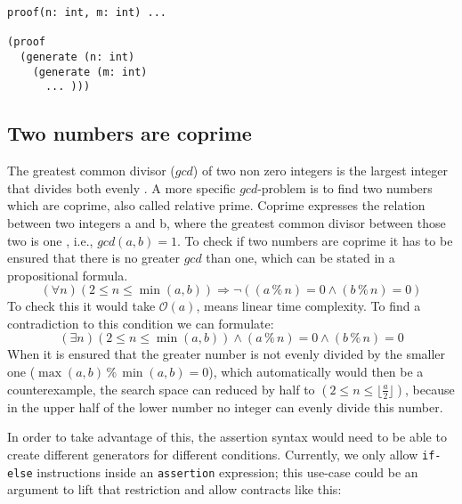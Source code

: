 \documentclass{article}
\begin{document}
\begin{lstlisting}[label=lst:proof, caption=Alternative syntax using proof or counterexample expressions]
proof(n: int, m: int) ... 

(proof
  (generate (n: int)
    (generate (m: int)
      ... )))
\end{lstlisting}

\subsection{Two numbers are coprime}\label{subsec:coprime}
The greatest common divisor ($gcd$) of two non zero integers is the largest integer that divides both evenly \cite{knuthtaocp02}. A more specific $gcd$-problem is to find two numbers which are coprime, also called relative prime. Coprime expresses the relation between two integers a and b, where the greatest common divisor between those two is one \cite{coprimewiki}, i.e., $gcd(a, b) = 1$. To check if two numbers are coprime it has to be ensured that there is no greater $gcd$ than one, which can be stated in a propositional formula.
\begin{equation}\label{eq:coprime-universial}
    (\forall n) (2 \le n \le \min(a,b)) \Rightarrow \neg((a \mathbin{\%} n) = 0 \land (b \mathbin{\%} n) = 0)
\end{equation}
To check this it would take $\mathcal{O}(a)$, means linear time complexity. To find a contradiction to this condition we can formulate:
\begin{equation}\label{eq:coprime-existential}
    (\exists n) (2 \le n \le \min(a,b)) \land (a \mathbin{\%} n) = 0 \land (b \mathbin{\%} n) = 0
\end{equation}
When it is ensured that the greater number is not evenly divided by the smaller one ($\max(a,b)\mathbin{\%}\min(a,b)=0$), which automatically would then be a counterexample, the search space can reduced by half to $(2 \le n \le \lfloor \frac{a}{2} \rfloor)$, because in the upper half of the lower number no integer can evenly divide this number.

In order to take advantage of this, the assertion syntax would need to be able to create different generators for different conditions. Currently, we only allow \texttt{if-else} instructions inside an \texttt{assertion} expression; this use-case could be an argument to lift that restriction and allow contracts like this:

\end{document}
